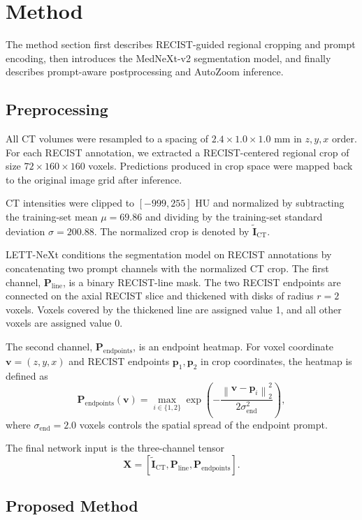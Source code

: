 \section{Method}
The method section first describes RECIST-guided regional cropping and prompt encoding, then introduces the MedNeXt-v2 segmentation model, and finally describes prompt-aware postprocessing and AutoZoom inference.


\subsection{Preprocessing}
\label{sec:input_preprocessing}

All CT volumes were resampled to a spacing of \(2.4 \times 1.0 \times 1.0\) mm in \(z,y,x\) order. For each RECIST annotation, we extracted a RECIST-centered regional crop of size \(72 \times 160 \times 160\) voxels. Predictions produced in crop space were mapped back to the original image grid after inference.

CT intensities were clipped to \([-999,255]\) HU and normalized by subtracting the training-set mean \(\mu=69.86\) and dividing by the training-set standard deviation \(\sigma=200.88\). The normalized crop is denoted by \(\tilde{\mathbf{I}}_{\mathrm{CT}}\).

LETT-NeXt conditions the segmentation model on RECIST annotations by concatenating two prompt channels with the normalized CT crop. The first channel, \(\mathbf{P}_{\mathrm{line}}\), is a binary RECIST-line mask. The two RECIST endpoints are connected on the axial RECIST slice and thickened with disks of radius \(r=2\) voxels. Voxels covered by the thickened line are assigned value 1, and all other voxels are assigned value 0.

The second channel, \(\mathbf{P}_{\mathrm{endpoints}}\), is an endpoint heatmap. For voxel coordinate \(\mathbf{v}=(z,y,x)\) and RECIST endpoints \(\mathbf{p}_1,\mathbf{p}_2\) in crop coordinates, the heatmap is defined as
\[
\mathbf{P}_{\mathrm{endpoints}}(\mathbf{v})
=
\max_{i \in \{1,2\}}
\exp
\left(
-\frac{
\left\| \mathbf{v} - \mathbf{p}_i \right\|_2^2
}{
2\sigma_{\mathrm{end}}^2
}
\right),
\]
where \(\sigma_{\mathrm{end}}=2.0\) voxels controls the spatial spread of the endpoint prompt.

The final network input is the three-channel tensor
\[
\mathbf{X}
=
\left[
\tilde{\mathbf{I}}_{\mathrm{CT}},
\mathbf{P}_{\mathrm{line}},
\mathbf{P}_{\mathrm{endpoints}}
\right].
\]

\subsection{Proposed Method}

